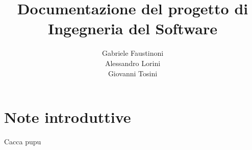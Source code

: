 \documentclass[a4paper, 12pt]{book}
\title{Documentazione del progetto di \\ Ingegneria del Software}
\author{Gabriele Faustinoni \\ Alessandro Lorini \\ Giovanni Tosini}
\date{}
\begin{document}
    \begin{titlepage}
        \maketitle
    \end{titlepage}

    \frontmatter
    \tableofcontents
    \mainmatter

    \chapter{Note introduttive}

    Cacca pupu
\end{document}
